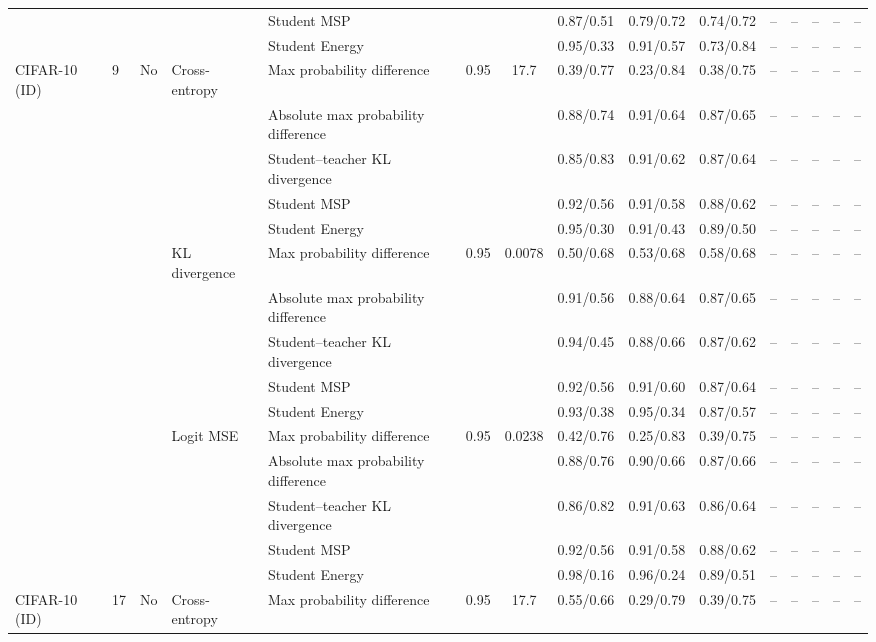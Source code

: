 \documentclass[border=2pt]{standalone}
\begin{document}
\begin{tabular}{lllllcccccccccc}
 &  &  &  & Student MSP &  &  & 0.87/0.51 & 0.79/0.72 & 0.74/0.72 & -- & -- & -- & -- & -- \\
 &  &  &  & Student Energy &  &  & 0.95/0.33 & 0.91/0.57 & 0.73/0.84 & -- & -- & -- & -- & -- \\
\addlinespace
CIFAR-10 (ID) & 9 & No & Cross-entropy & Max probability difference & 0.95 & 17.7 & 0.39/0.77 & 0.23/0.84 & 0.38/0.75 & -- & -- & -- & -- & -- \\
 &  &  &  & Absolute max probability difference &  &  & 0.88/0.74 & 0.91/0.64 & 0.87/0.65 & -- & -- & -- & -- & -- \\
 &  &  &  & Student--teacher KL divergence &  &  & 0.85/0.83 & 0.91/0.62 & 0.87/0.64 & -- & -- & -- & -- & -- \\
 &  &  &  & Student MSP &  &  & 0.92/0.56 & 0.91/0.58 & 0.88/0.62 & -- & -- & -- & -- & -- \\
 &  &  &  & Student Energy &  &  & 0.95/0.30 & 0.91/0.43 & 0.89/0.50 & -- & -- & -- & -- & -- \\
 &  &  & KL divergence & Max probability difference & 0.95 & 0.0078 & 0.50/0.68 & 0.53/0.68 & 0.58/0.68 & -- & -- & -- & -- & -- \\
 &  &  &  & Absolute max probability difference &  &  & 0.91/0.56 & 0.88/0.64 & 0.87/0.65 & -- & -- & -- & -- & -- \\
 &  &  &  & Student--teacher KL divergence &  &  & 0.94/0.45 & 0.88/0.66 & 0.87/0.62 & -- & -- & -- & -- & -- \\
 &  &  &  & Student MSP &  &  & 0.92/0.56 & 0.91/0.60 & 0.87/0.64 & -- & -- & -- & -- & -- \\
 &  &  &  & Student Energy &  &  & 0.93/0.38 & 0.95/0.34 & 0.87/0.57 & -- & -- & -- & -- & -- \\
 &  &  & Logit MSE & Max probability difference & 0.95 & 0.0238 & 0.42/0.76 & 0.25/0.83 & 0.39/0.75 & -- & -- & -- & -- & -- \\
 &  &  &  & Absolute max probability difference &  &  & 0.88/0.76 & 0.90/0.66 & 0.87/0.66 & -- & -- & -- & -- & -- \\
 &  &  &  & Student--teacher KL divergence &  &  & 0.86/0.82 & 0.91/0.63 & 0.86/0.64 & -- & -- & -- & -- & -- \\
 &  &  &  & Student MSP &  &  & 0.92/0.56 & 0.91/0.58 & 0.88/0.62 & -- & -- & -- & -- & -- \\
 &  &  &  & Student Energy &  &  & 0.98/0.16 & 0.96/0.24 & 0.89/0.51 & -- & -- & -- & -- & -- \\
\addlinespace
CIFAR-10 (ID) & 17 & No & Cross-entropy & Max probability difference & 0.95 & 17.7 & 0.55/0.66 & 0.29/0.79 & 0.39/0.75 & -- & -- & -- & -- & -- \\

\end{tabular}
\end{document}

